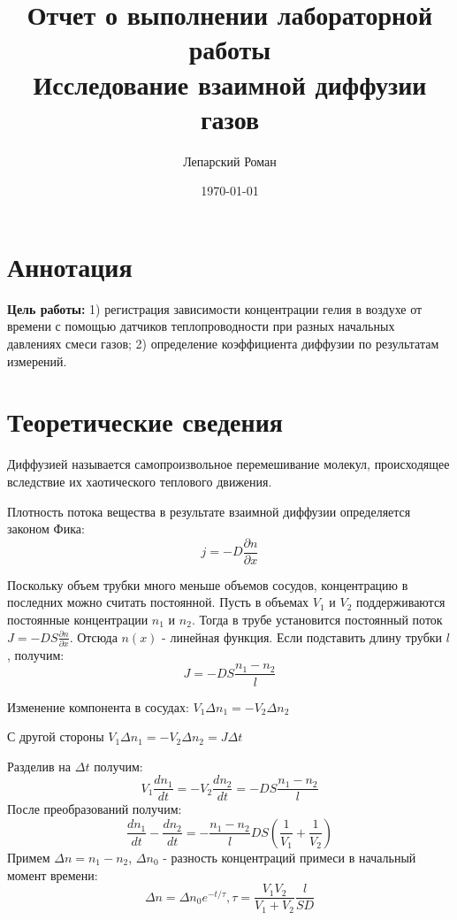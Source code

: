 \documentclass[12pt]{article}
\title{Отчет о выполнении лабораторной работы \\ Исследование взаимной диффузии газов}
\author{Лепарский Роман}
\date{\today}
\begin{document}
\maketitle

\newpage

\section{Аннотация}

\textbf{Цель работы:} 1) регистрация зависимости концентрации гелия в воздухе от времени с помощью датчиков теплопроводности
при разных начальных давлениях смеси газов; 2) определение 
коэффициента диффузии по результатам измерений.

\section{Теоретические сведения}

Диффузией называется самопроизвольное перемешивание молекул, происходящее вследствие их хаотического теплового движения.

Плотность потока вещества в результате взаимной диффузии определяется законом Фика:
\begin{equation}
	j = -D\frac{\partial n}{\partial x}
\end{equation}

Поскольку объем трубки много меньше объемов сосудов, 
концентрацию в последних можно считать постоянной. Пусть в объемах $V_1$ и $V_2$ поддерживаются постоянные концентрации
$n_1$ и $n_2$. Тогда в трубе установится постоянный поток $J = -DS\frac{\partial n}{\partial x}$. Отсюда $n(x)$ - линейная функция. Если подставить длину трубки $l$, получим:
\begin{equation}
	J = -DS\frac{n_1 - n_2}{l}
\end{equation}

Изменение компонента в сосудах: $V_1\Delta n_1=-V_2\Delta n_2$

С другой стороны $V_1\Delta n_1=-V_2\Delta n_2=J\Delta t$

Разделив на $\Delta t$ получим:
\[
	V_1\frac{dn_1}{dt}=-V_2\frac{dn_2}{dt}=-DS\frac{n_1-n_2}{l}
\]
После преобразований получим:
\[
	\frac{dn_1}{dt} - \frac{dn_2}{dt} = -\frac{n_1-n_2}{l}DS\left(\frac{1}{V_1} + \frac{1}{V_2}\right)
\]
Примем $\Delta n = n_1 - n_2$, $\Delta n_0$ - разность концентраций примеси в начальный момент времени:
\begin{equation}
	\Delta n=\Delta n_0 e^{-t/\tau},  \tau=\frac{V_1V_2}{V_1+V_2}\frac{l}{SD}
	\label{eq:tauIs}
\end{equation}
\end{document}
